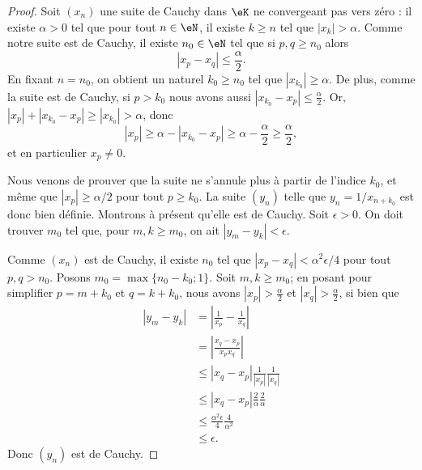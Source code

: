 \begin{proof}
  Soit \( (x_n)\) une suite de Cauchy dans \( \eK\) ne convergeant pas vers zéro : il existe \( \alpha>0\) tel que pour tout \( n \in \eN\), il existe \( k \geq n\) tel que \( | x_k |>\alpha\). Comme notre suite est de Cauchy, il existe \( n_0 \in \eN\) tel que si \( p,q\geq n_0\) alors
            \begin{equation}
                | x_p-x_q |\leq \frac{ \alpha }{2}.
            \end{equation}
            En fixant \( n = n_0\), on obtient un naturel \( k_0\geq n_0\) tel que \( | x_{k_0} |\geq \alpha\). De plus, comme la suite est de Cauchy, si \( p>{k_0}\) nous avons aussi \( | x_{k_0}-x_p |\leq \frac{ \alpha }{2}\). Or, \( |x_p| + | x_{k_0}-x_p | \geq | x_{k_0} |>\alpha\), donc
            \begin{equation}
              | x_p |\geq \alpha - | x_{k_0}-x_p | \geq \alpha - \frac{ \alpha }{2} \geq \frac{ \alpha }{2},
            \end{equation}
et en particulier \( x_p\neq 0\).

            Nous venons de prouver que la suite ne s'annule plus à partir de l'indice \( k_0\), et même que \( | x_p |\geq\alpha/2\) pour tout \( p\geq k_0\). La suite  \( (y_n) \) telle que \( y_n = 1/x_{n+k_0}\) est donc bien définie. Montrons à présent qu'elle est de Cauchy. Soit \( \epsilon>0\). On doit trouver \( m_0 \) tel que, pour \( m, k \geq m_0 \), on ait \( | y_m - y_k | < \epsilon \).

Comme \( (x_n) \) est de Cauchy, il existe \( n_0\) tel que \( | x_p-x_q |< \alpha^2 \epsilon / 4 \) pour tout \( p,q>n_0\). Posons \( m_0 = \max \{ n_0 - k_0; 1 \} \). Soit \( m,k\geq m_0\); en posant pour simplifier \( p = m + k_0 \) et \( q = k + k_0 \), nous avons \( |  x_p|>\frac{ \alpha }{2}\) et \( | x_q |>\frac{ \alpha }{2}\), si bien que
\begin{align}
  | y_m - y_k | &= \left| \frac{1}{ x_p }-\frac{1}{ x_q } \right|\\
                &= \left|\frac{  x_q-x_p  }{  x_px_q }\right|\\
                &\leq  |x_q-x_p| \frac 1{| x_p|} \frac 1 {| x_q|}\\
                & \leq |x_q-x_p| \frac 2 \alpha \frac 2 \alpha \\
                &\leq \frac {\alpha^2 \epsilon } 4 \frac 4 {\alpha^2}\\
                &\leq \epsilon.
\end{align}
Donc \( (y_n) \) est de Cauchy.
\end{proof}


